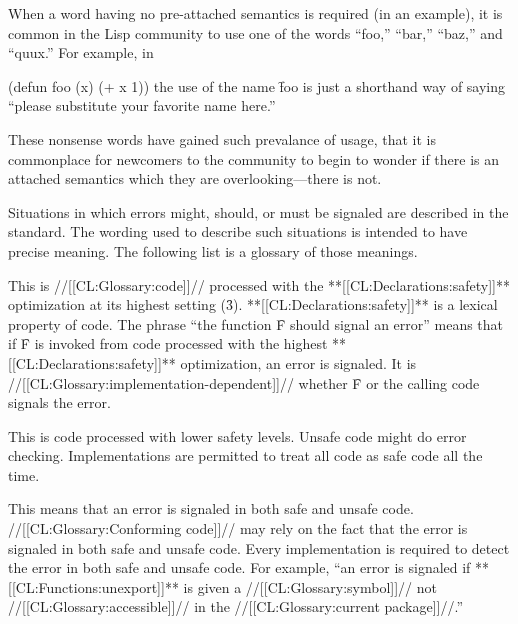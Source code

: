 When a word having no pre-attached semantics is required (\eg in an example), it is common in the Lisp community to use one of the words ``foo,'' ``bar,'' ``baz,'' and ``quux.''  For example, in

\code
 (defun foo (x) (+ x 1)) \endcode the use of the name \f{foo} is just a shorthand way of saying  ``please substitute your favorite name here.''

These nonsense words have gained such prevalance of usage, that it is commonplace for newcomers to the community to begin to wonder if there is an attached semantics which they are overlooking---there is not.

\endsubsubsection%

\endsubSection%

 

Situations in which errors might, should, or must be signaled are described in the standard.  The wording used to describe such situations is intended to have precise meaning. The following list is a glossary of those meanings.

\beginlist {}

This is //[[CL:Glossary:code]]// processed with the **[[CL:Declarations:safety]]** optimization  at its highest setting (\f{3}).  **[[CL:Declarations:safety]]** is a lexical property of code.  The phrase ``the function \f{F} should signal an error''  means that if \f{F} is invoked from code processed with the highest **[[CL:Declarations:safety]]** optimization, an error is signaled. It is //[[CL:Glossary:implementation-dependent]]// whether \f{F} or the calling  code signals the error.


This is code processed with lower safety levels. 		         Unsafe code might do error checking.  Implementations are permitted to treat all code as safe code all the time.
                        


This means that an error is signaled in both safe and unsafe code. //[[CL:Glossary:Conforming code]]// may rely on the fact that the error is signaled in both safe and unsafe code.  Every implementation is required to detect the error in both safe and unsafe code. For example, ``an error is signaled if **[[CL:Functions:unexport]]** is given a //[[CL:Glossary:symbol]]// not //[[CL:Glossary:accessible]]// in the //[[CL:Glossary:current package]]//.''


